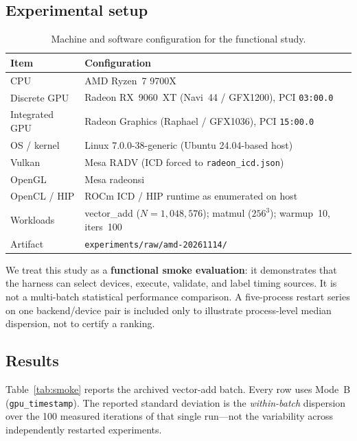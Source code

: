\documentclass[11pt,a4paper]{article}
\begin{document}
\subsection{Experimental setup}

\begin{table}[t]
\centering
\small
\begin{tabular}{@{}p{3.2cm}p{9.0cm}@{}}
\toprule
Item & Configuration \\
\midrule
CPU & AMD Ryzen~7 9700X \\
Discrete GPU & Radeon RX~9060~XT (Navi~44 / GFX1200), PCI \texttt{03:00.0} \\
Integrated GPU & Radeon Graphics (Raphael / GFX1036), PCI \texttt{15:00.0} \\
OS / kernel & Linux 7.0.0-38-generic (Ubuntu 24.04-based host) \\
Vulkan & Mesa RADV (ICD forced to \texttt{radeon\_icd.json}) \\
OpenGL & Mesa radeonsi \\
OpenCL / HIP & ROCm ICD / HIP runtime as enumerated on host \\
Workloads & vector\_add ($N=1{,}048{,}576$); matmul ($256^3$); warmup~10,
           iters~100 \\
Artifact & \texttt{experiments/raw/amd-20261114/} \\
\bottomrule
\end{tabular}
\caption{Machine and software configuration for the functional study.}
\label{tab:machine}
\end{table}

We treat this study as a \textbf{functional smoke evaluation}: it demonstrates
that the harness can select devices, execute, validate, and label timing
sources. It is not a multi-batch statistical performance comparison.
A five-process restart series on one backend/device pair is included only to
illustrate process-level median dispersion, not to certify a ranking.

\subsection{Results}

Table~\ref{tab:smoke} reports the archived vector-add batch. Every row uses
Mode~B (\texttt{gpu\_timestamp}). The reported standard deviation is the
\emph{within-batch} dispersion over the 100 measured iterations of that
single run---not the variability across independently restarted experiments.
\end{document}
